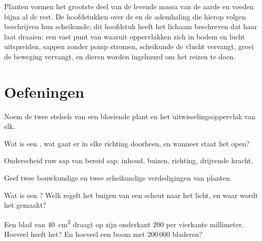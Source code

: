 \begin{remark}\label{rem:g12:plant-rooted-life:half}
Planten vormen het grootste deel van de levende massa van de aarde en
voeden bijna al de rest. De hoofdstukken over de  en de
ademhaling die hierop volgen beschrijven hun scheikunde; dit hoofdstuk
heeft het lichaam beschreven dat haar laat draaien: een vast punt van
waaruit oppervlakken zich in bodem en lucht uitspreiden, sappen zonder
pomp stromen, scheikunde de vlucht vervangt, groei de beweging vervangt,
en dieren worden ingehuurd om het reizen te doen.
\end{remark}

\section{Oefeningen}

\begin{exercise}[$\star$]\label{exo:g12:plant-rooted-life:1}
Noem de twee stelsels van een bloeiende plant en het uitwisselingsoppervlak
van elk.
\end{exercise}

\begin{exercise}[$\star$]\label{exo:g12:plant-rooted-life:2}
Wat is een , wat gaat er in elke richting doorheen, en wanneer
staat het open?
\end{exercise}

\begin{exercise}[$\star$]\label{exo:g12:plant-rooted-life:3}
Onderscheid ruw sap van bereid sap: inhoud, buizen, richting, drijvende
kracht.
\end{exercise}

\begin{exercise}[$\star$]\label{exo:g12:plant-rooted-life:4}
Geef twee bouwkundige en twee scheikundige verdedigingen van planten.
\end{exercise}

\begin{exercise}[$\star$]\label{exo:g12:plant-rooted-life:5}
Wat is een ? Welk  regelt het buigen van een scheut naar
het licht, en waar wordt het gemaakt?
\end{exercise}

\begin{exercise}[$\star\star$]\label{exo:g12:plant-rooted-life:6}
Een blad van \qty{40}{cm^2} draagt op zijn onderkant 200  per
vierkante millimeter. Hoeveel  heeft het? En hoeveel een boom
met 200\,000 bladeren?
\end{exercise}

